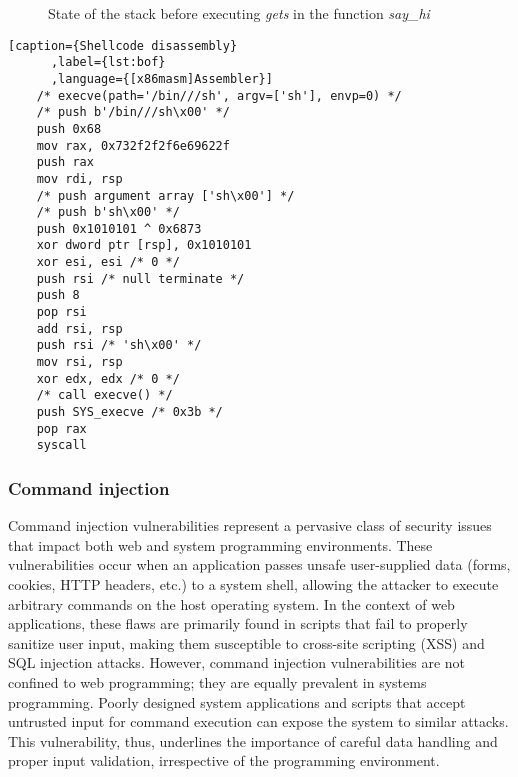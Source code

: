\documentclass{article}
\begin{document}
\begin{figure}[ht]
  \caption{\label{fig:label} State of the stack before executing \emph{gets} in the function \emph{say\_hi}}%
  \label{fig:stackframe}
\end{figure}

\begin{lstlisting}[caption={Shellcode disassembly}
      ,label={lst:bof}
      ,language={[x86masm]Assembler}]
    /* execve(path='/bin///sh', argv=['sh'], envp=0) */
    /* push b'/bin///sh\x00' */
    push 0x68
    mov rax, 0x732f2f2f6e69622f
    push rax
    mov rdi, rsp
    /* push argument array ['sh\x00'] */
    /* push b'sh\x00' */
    push 0x1010101 ^ 0x6873
    xor dword ptr [rsp], 0x1010101
    xor esi, esi /* 0 */
    push rsi /* null terminate */
    push 8
    pop rsi
    add rsi, rsp
    push rsi /* 'sh\x00' */
    mov rsi, rsp
    xor edx, edx /* 0 */
    /* call execve() */
    push SYS_execve /* 0x3b */
    pop rax
    syscall
\end{lstlisting}

\subsubsection{Command injection}
Command injection vulnerabilities represent a pervasive class of security issues
that impact both web and system programming environments. These vulnerabilities
occur when an application passes unsafe user-supplied data (forms, cookies, HTTP
headers, etc.) to a system shell, allowing the attacker to execute arbitrary
commands on the host operating system. In the context of web applications, these
flaws are primarily found in scripts that fail to properly sanitize user input,
making them susceptible to cross-site scripting (XSS) and SQL injection attacks.
However, command injection vulnerabilities are not confined to web programming;
they are equally prevalent in systems programming. Poorly designed system
applications and scripts that accept untrusted input for command execution can
expose the system to similar attacks. This vulnerability, thus, underlines the
importance of careful data handling and proper input validation, irrespective of
the programming environment.
\end{document}
